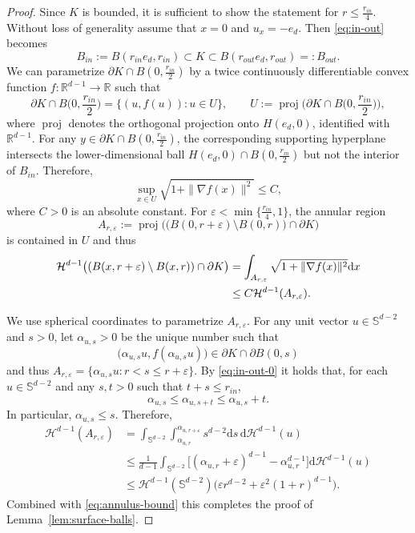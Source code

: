 \documentclass[12pt]{article}
\newcommand{\IR}{\mathds{R}}
\newcommand{\Sp}{\mathds{S}}
\DeclareMathOperator{\Proj}{proj}
\def\cH{{\mathcal H}}
\def\e{\varepsilon}
\def\bd{{\partial}}
\newcommand{\dd}{\mathrm{d}}
\theoremstyle{definition}
\begin{document}
\begin{proof}
Since $K$ is bounded, it is sufficient to show the statement for $r\le \frac{r_{in}}{4}$. Without loss of generality assume that $x=0$ and $u_x=-e_d$. Then \eqref{eq:in-out} becomes
\begin{equation} \label{eq:in-out-0}
B_{in}:=B(r_{in} e_d, r_{in})
\subset K
\subset B(r_{out} e_d, r_{out})=:B_{out}.
\end{equation}
We can parametrize $\bd K\cap B(0,\frac{r_{in}}{2})$ by a twice continuously differentiable convex function $f\colon \IR^{d-1}\to \IR$ such that 
\begin{equation*} 
\bd K\cap B\Big(0,\frac{r_{in}}{2}\Big)
=\{ (u,f(u))\colon u\in U\},\qquad U:=\Proj\Big(\bd K\cap B\Big(0,\frac{r_{in}}{2}\Big)\Big),
\end{equation*}
where $\Proj$ denotes the orthogonal projection onto $H(e_d,0)$, identified with $\IR^{d-1}$. For any $y\in \partial K\cap B(0,\frac{r_{in}}{2})$, the corresponding supporting hyperplane intersects the lower-dimensional ball $H(e_d,0)\cap B(0,\frac{r_{in}}{2})$ but not the interior of $B_{in}$. Therefore, 
\begin{equation*} 
\sup_{x\in U}\sqrt{1+\|\nabla f(x)\|^2} \le C,
\end{equation*}
where $C>0$ is an absolute constant. For $\e<\min\{\frac{r_{in}}{4},1\}$, the annular region 
\[
A_{r,\varepsilon}
:=\Proj\big(\big(B(0,r+\e)\setminus B(0,r)\big)\cap \bd K\big)
\]
is contained in $U$ and thus
\begin{align}\label{eq:annulus-bound}
	\cH^{d-1}\big( (B(x, r+\e)\setminus B(x,r))\cap \bd K\big)
	&=\int_{A_{r,\varepsilon}}\sqrt{1+\|\nabla f(x)\|^2}\dd x\notag\\
	&\le C \cH^{d-1}(A_{r,\varepsilon}).
\end{align}

We use spherical coordinates to parametrize $A_{r,\varepsilon}$. For any unit vector $u\in \Sp^{d-2}$ and $s>0$, let $\alpha_{u,s}>0$ be the unique number such that 
\[
\big(\alpha_{u,s}u,f(\alpha_{u,s}u)\big)\in \partial K\cap \partial B(0,s)
\]
and thus
$
A_{r,\varepsilon}
=\{\alpha_{u,s}u\colon r< s \le r+\varepsilon\}.
$
By \eqref{eq:in-out-0} it holds that, for each $u\in \Sp^{d-2}$ and any $s,t>0$ such that $t+s\le r_{in}$, 
\begin{equation*} 
	\alpha_{u,s}\le \alpha_{u,s+t} \le \alpha_{u,s}+t.
\end{equation*}
In particular, $\alpha_{u,s}\le s$. Therefore,
\begin{align*}
	\cH^{d-1}(A_{r,\varepsilon})
	&=\int_{\Sp^{d-2}}\int_{\alpha_{u,r}}^{\alpha_{u,r+\varepsilon}}s^{d-2}\dd s\, \dd\cH^{d-1}(u)\\
	&\le \frac{1}{d-1}\int_{\Sp^{d-2}}\big[(\alpha_{u,r}+\varepsilon)^{d-1}-\alpha_{u,r}^{d-1}\big]\dd\cH^{d-1}(u)\\
	&\le \cH^{d-1}(\Sp^{d-2})\big(\varepsilon r^{d-2}+\varepsilon^2(1+r)^{d-1}\big).
\end{align*}
Combined with \eqref{eq:annulus-bound} this completes the proof of Lemma~\ref{lem:surface-balls}.
\end{proof}
\end{document}
